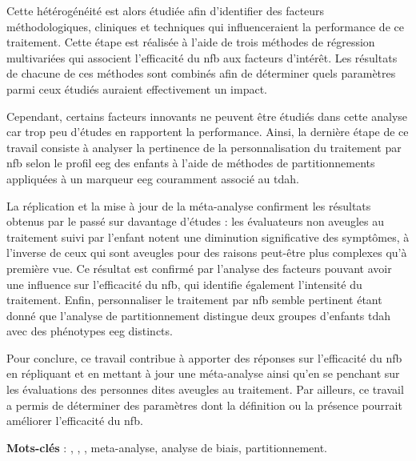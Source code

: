 Cette hétérogénéité est alors étudiée afin d'identifier des facteurs méthodologiques, cliniques et techniques qui influenceraient 
la performance de ce traitement. Cette étape 
est réalisée à l'aide de trois méthodes de régression multivariées qui associent l'efficacité du \gls{nfb} aux facteurs d'intérêt. 
Les résultats de chacune de ces méthodes sont combinés afin de déterminer quels paramètres parmi ceux étudiés auraient effectivement un impact. 

Cependant, certains facteurs innovants ne peuvent être étudiés dans cette analyse car trop peu d'études en rapportent la performance. 
Ainsi, la dernière étape de ce travail consiste à analyser la pertinence de la personnalisation du traitement par \gls{nfb} selon le profil 
\gls{eeg} des enfants à l'aide de méthodes de partitionnements appliquées à un marqueur \gls{eeg} couramment associé au \gls{tdah}. 

La réplication et la mise à jour de la méta-analyse confirment les résultats obtenus par le passé sur davantage d'études : 
les évaluateurs non aveugles au traitement suivi par l'enfant notent une diminution significative des symptômes, à l'inverse 
de ceux qui sont aveugles pour des raisons peut-être plus complexes qu'à première vue. Ce résultat est confirmé par l'analyse 
des facteurs pouvant avoir une influence sur l'efficacité du \gls{nfb}, qui identifie également l'intensité du traitement. Enfin, 
personnaliser le traitement par \gls{nfb} semble pertinent étant donné que l'analyse de partitionnement distingue deux groupes d'enfants 
\gls{tdah} avec des phénotypes \gls{eeg} distincts.

Pour conclure, ce travail contribue à apporter des réponses sur l'efficacité du \gls{nfb} en répliquant et en mettant à jour une méta-analyse 
ainsi qu'en se penchant sur les évaluations des personnes dites aveugles au traitement. Par ailleurs, ce travail a permis de déterminer des paramètres dont la définition ou la présence 
pourrait améliorer l'efficacité du \gls{nfb}.

\large{\textbf{Mots-clés}} : , , , meta-analyse, analyse de biais, partitionnement.